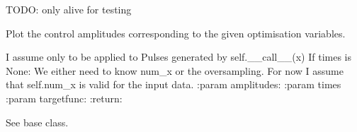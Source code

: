 \documentclass[letterpaper,10pt,english]{sphinxmanual}
\begin{document}
\begin{fulllineitems}
\begin{fulllineitems}
\label{\detokenize{qsim:qsim.transfer_function.ExponentialTF.old_call}}
TODO: only alive for testing

\end{fulllineitems}


\begin{fulllineitems}
\label{\detokenize{qsim:qsim.transfer_function.ExponentialTF.plot_pulse_old}}
Plot the control amplitudes corresponding to the given optimisation
variables.

\end{fulllineitems}


\begin{fulllineitems}
\label{\detokenize{qsim:qsim.transfer_function.ExponentialTF.reverse_state}}
I assume only to be applied to Pulses generated by self.\_\_call\_\_(x)
If times is None:
We either need to know num\_x or the oversampling. For now I assume that
self.num\_x is valid for the input data.
:param amplitudes:
:param times
:param targetfunc:
:return:

\end{fulllineitems}


\begin{fulllineitems}
\label{\detokenize{qsim:qsim.transfer_function.ExponentialTF.transfer_matrix}}
See base class.

\end{fulllineitems}


\end{fulllineitems}
\end{document}
